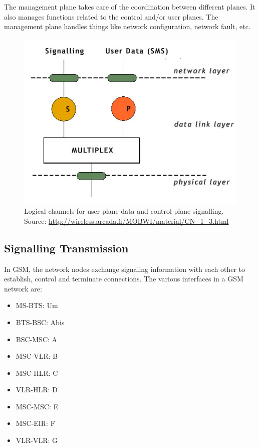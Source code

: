 The management plane takes care of the coordination between different planes.
It also manages functions related to the control and/or user planes.
The management plane handles things like network configuration, network fault, etc.

\begin{figure}
\centering
\includegraphics[scale=0.7]{logicalChannelsUserControl}
\caption[Logical channels for user plane data and control plane signalling]{Logical channels for user plane data and control plane signalling.\\
\footnotesize{Source: \url{http://wireless.arcada.fi/MOBWI/material/CN\_1\_3.html}}}
\end{figure}

\subsection{Signalling Transmission}
In GSM, the network nodes exchange signaling information with each other to establish, control and terminate connections.
The various interfaces in a GSM network are:
\begin{itemize}
 \item MS-BTS: Um
 \item BTS-BSC: Abis
 \item BSC-MSC: A
 \item MSC-VLR: B
 \item MSC-HLR: C
 \item VLR-HLR: D
 \item MSC-MSC: E
 \item MSC-EIR: F
 \item VLR-VLR: G
\end{itemize}


